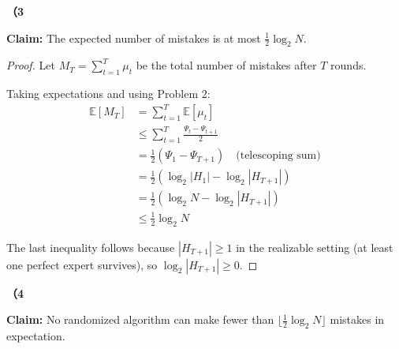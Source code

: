 \documentclass[letterpaper, 11pt]{article}
\newcommand{\1}{\mathds{1}}	%
\theoremstyle{definition}
\begin{document}
\textbf{（3}

\textbf{Claim:} The expected number of mistakes is at most $\frac{1}{2}\log_2 N$.

\begin{proof}
Let $M_T = \sum_{t=1}^{T} \mu_t$ be the total number of mistakes after $T$ rounds.

Taking expectations and using Problem 2:
\begin{align*}
\mathbb{E}[M_T] &= \sum_{t=1}^{T} \mathbb{E}[\mu_t] \\
&\leq \sum_{t=1}^{T} \frac{\Psi_t - \Psi_{t+1}}{2} \\
&= \frac{1}{2}(\Psi_1 - \Psi_{T+1}) \quad \text{(telescoping sum)} \\
&= \frac{1}{2}(\log_2 |H_1| - \log_2 |H_{T+1}|) \\
&= \frac{1}{2}(\log_2 N - \log_2 |H_{T+1}|) \\
&\leq \frac{1}{2}\log_2 N
\end{align*}

The last inequality follows because $|H_{T+1}| \geq 1$ in the realizable setting (at least one perfect expert survives), so $\log_2 |H_{T+1}| \geq 0$.
\end{proof}

\textbf{（4}

\textbf{Claim:} No randomized algorithm can make fewer than $\lfloor \frac{1}{2}\log_2 N \rfloor$ mistakes in expectation.
\end{document}
